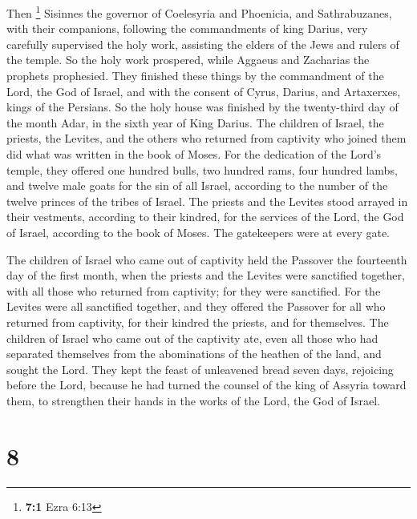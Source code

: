  Then \footnote{\textbf{7:1} Ezra 6:13} Sisinnes the
governor of Coelesyria and Phoenicia, and Sathrabuzanes, with their
companions, following the commandments of king Darius, 
very carefully supervised the holy work, assisting the elders of the
Jews and rulers of the temple.  So the holy work
prospered, while Aggaeus and Zacharias the prophets prophesied.
 They finished these things by the commandment of the
Lord, the God of Israel, and with the consent of Cyrus, Darius, and
Artaxerxes, kings of the Persians.  So the holy house was
finished by the twenty-third day of the month Adar, in the sixth year of
King Darius.  The children of Israel, the priests, the
Levites, and the others who returned from captivity who joined them did
what was written in the book of Moses.  For the dedication
of the Lord's temple, they offered one hundred bulls, two hundred rams,
four hundred lambs,  and twelve male goats for the sin of
all Israel, according to the number of the twelve princes of the tribes
of Israel.  The priests and the Levites stood arrayed in
their vestments, according to their kindred, for the services of the
Lord, the God of Israel, according to the book of Moses. The gatekeepers
were at every gate.

 The children of Israel who came out of captivity held
the Passover the fourteenth day of the first month, when the priests and
the Levites were sanctified together,  with all those who
returned from captivity; for they were sanctified. For the Levites were
all sanctified together,  and they offered the Passover
for all who returned from captivity, for their kindred the priests, and
for themselves.  The children of Israel who came out of
the captivity ate, even all those who had separated themselves from the
abominations of the heathen of the land, and sought the Lord.
 They kept the feast of unleavened bread seven days,
rejoicing before the Lord,  because he had turned the
counsel of the king of Assyria toward them, to strengthen their hands in
the works of the Lord, the God of Israel.

\hypertarget{section-7}{%
\section{8}\label{section-7}}

